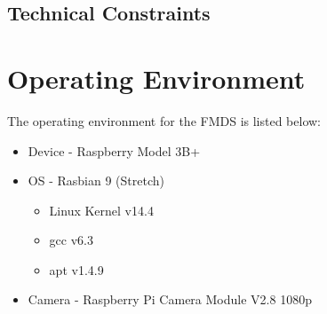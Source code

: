 	\subsection{Technical Constraints}
		\begin{flushleft}
		\end{flushleft}



\section{Operating Environment}


The operating environment for the FMDS is listed below: 
\begin{itemize} 
	\item Device - Raspberry Model 3B+
	\item OS - Rasbian 9 (Stretch) 
	\begin{itemize}
		\item Linux Kernel v14.4
		\item gcc v6.3
		\item apt v1.4.9
	\end{itemize}
	\item Camera - Raspberry Pi Camera Module V2.8 1080p
\end{itemize}





